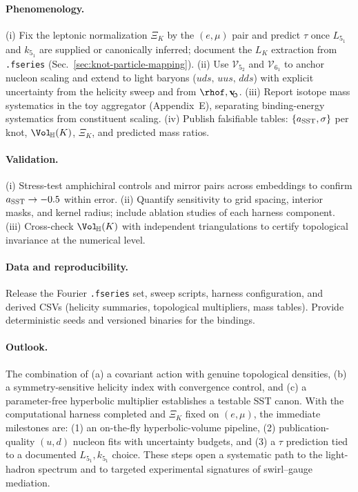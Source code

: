 \documentclass[11pt, preprint,titlepage]{revtex4-2}
\newcommand{\swirlarrow}{\!\!\scriptsize\boldsymbol{\circlearrowleft}}
\newcommand{\vswirl}{\mathbf{v}_{\swirlarrow}}
\begin{document}
    \paragraph{Phenomenology.}
    (i) Fix the leptonic normalization \(\Xi_K\) by the \((e,\mu)\) pair and predict \(\tau\) once \(L_{5_1}\) and \(k_{5_1}\) are supplied or canonically inferred; document the \(L_K\) extraction from \texttt{.fseries} (Sec.~\ref{sec:knot-particle-mapping}).
    (ii) Use \(\mathcal{V}_{5_2}\) and \(\mathcal{V}_{6_1}\) to anchor nucleon scaling and extend to light baryons (\(uds,\,uus,\,dds\)) with explicit uncertainty from the helicity sweep and from \(\rhof,\vswirl\).
    (iii) Report isotope mass systematics in the toy aggregator (Appendix~E), separating binding-energy systematics from constituent scaling.
    (iv) Publish falsifiable tables: \(\{a_{\rm SST},\sigma\}\) per knot, \(\Vol_{\!\mathbb{H}}(K)\), \(\Xi_K\), and predicted mass ratios.

    \paragraph{Validation.}
    (i) Stress-test amphichiral controls and mirror pairs across embeddings to confirm \(a_{\rm SST}\rightarrow -0.5\) within error.
    (ii) Quantify sensitivity to grid spacing, interior masks, and kernel radius; include ablation studies of each harness component.
    (iii) Cross-check \(\Vol_{\!\mathbb{H}}(K)\) with independent triangulations to certify topological invariance at the numerical level.

    \paragraph{Data and reproducibility.}
    Release the Fourier \texttt{.fseries} set, sweep scripts, harness configuration, and derived CSVs (helicity summaries, topological multipliers, mass tables). Provide deterministic seeds and versioned binaries for the bindings.

    \paragraph{Outlook.}
    The combination of (a) a covariant action with genuine topological densities, (b) a symmetry-sensitive helicity index with convergence control, and (c) a parameter-free hyperbolic multiplier establishes a testable SST canon. With the computational harness completed and \(\Xi_K\) fixed on \((e,\mu)\), the immediate milestones are: (1) an on-the-fly hyperbolic-volume pipeline, (2) publication-quality \((u,d)\) nucleon fits with uncertainty budgets, and (3) a \(\tau\) prediction tied to a documented \(L_{5_1},k_{5_1}\) choice. These steps open a systematic path to the light-hadron spectrum and to targeted experimental signatures of swirl–gauge mediation.
\end{document}
